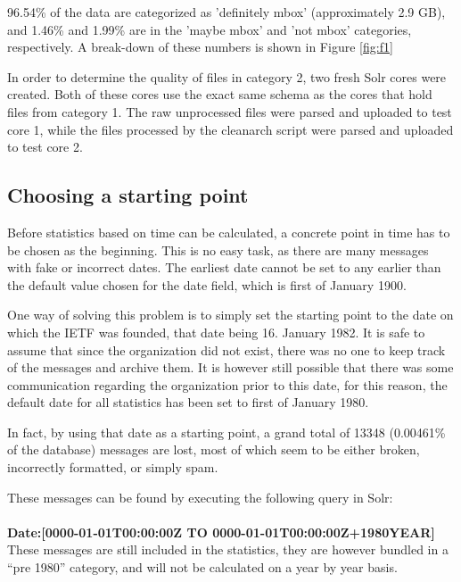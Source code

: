 \documentclass[a4paper,english]{report}
\begin{document}
96.54\% of the data are categorized as 'definitely mbox' (approximately 2.9 GB), and 1.46\% and 1.99\% are in the 'maybe mbox' and 'not mbox' categories, respectively. A break-down of these numbers is shown in Figure \ref{fig:f1}

In order to determine the quality of files in category 2, two fresh Solr cores were created. Both of these cores use the exact same schema as the cores that hold files from category 1.
The raw unprocessed files were parsed and uploaded to test core 1, while the files processed by the cleanarch script were parsed and uploaded to test core 2.



\subsection{Choosing a starting point}

Before statistics based on time can be calculated, a concrete point in time has to be chosen as the beginning. This is no easy task, as there are many messages with fake or incorrect dates. The earliest date cannot be set to any earlier than the default value chosen for the date field, which is first of January 1900.

One way of solving this problem is to simply set the starting point to the date on which the IETF was founded, that date being 16. January 1982. It is safe to assume that since the organization did not exist, there was no one to keep track of the messages and archive them. It is however still possible that there was some communication regarding the organization prior to this date, for this reason, the default date for all statistics has been set to first of January 1980.

In fact, by using that date as a starting point, a grand total of 13348 (0.00461\% of the database) messages are lost, most of which seem to be either broken, incorrectly formatted, or simply spam.

These messages can be found by executing the following query in Solr:\\\\
\noindent
\textbf{Date:[0000-01-01T00:00:00Z TO 0000-01-01T00:00:00Z+1980YEAR]}  \\

These messages are still included in the statistics, they are however bundled in a “pre 1980” category, and will not be calculated on a year by year basis.\\\\
\end{document}
